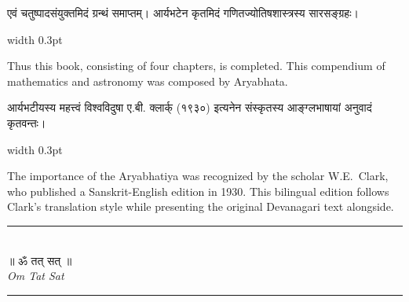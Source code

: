 \documentclass[11pt,a4paper]{article}
\newlength{\leftcolwidth}
\newlength{\rightcolwidth}
\newenvironment{sanskritcol}{\begin{minipage}[t]{\leftcolwidth}\devanagarifont}{\end{minipage}}
\newenvironment{englishcol}{\begin{minipage}[t]{\rightcolwidth}\small}{\end{minipage}}
\begin{document}
\noindent
\begin{sanskritcol}
एवं चतुष्पादसंयुक्तमिदं ग्रन्थं समाप्तम्। आर्यभटेन कृतमिदं गणितज्योतिषशास्त्रस्य सारसङ्ग्रहः।
\end{sanskritcol}%
\hfill\vrule width 0.3pt\hfill
\begin{englishcol}
Thus this book, consisting of four chapters, is completed. This compendium of mathematics and astronomy was composed by Aryabhata.
\end{englishcol}
\par\medskip

\vspace{0.5cm}

\noindent{}\par\medskip

\vspace{0.5cm}

\noindent
\begin{sanskritcol}
आर्यभटीयस्य महत्त्वं विश्वविदुषा ए.बी. क्लार्क् (१९३०) इत्यनेन संस्कृतस्य आङ्ग्लभाषायां अनुवादं कृतवन्तः।
\end{sanskritcol}%
\hfill\vrule width 0.3pt\hfill
\begin{englishcol}
The importance of the Aryabhatiya was recognized by the scholar W.E.\ Clark, who published a Sanskrit-English edition in 1930. This bilingual edition follows Clark's translation style while presenting the original Devanagari text alongside.
\end{englishcol}
\par\medskip

\vspace{0.5cm}

\begin{center}
\textcolor{rulecolor}{\rule{0.5\textwidth}{0.5pt}}\\[0.5em]
{\Large\devanagarifont ॥ ॐ तत् सत् ॥}\\[0.5em]
\textit{Om Tat Sat}\\[0.3em]
\textcolor{rulecolor}{\rule{0.5\textwidth}{0.5pt}}
\end{center}
\end{document}
